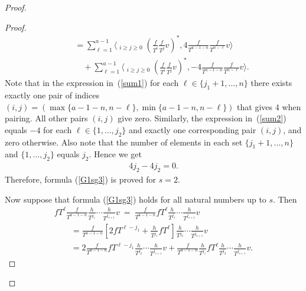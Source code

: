 \documentclass[11pt]{article}
\numberwithin{equation}{section}
\begin{document}
\begin{proof}
\begin{proof}
\begin{gather}
\qquad{} = \sum_{\ell=1}^{a-1} \bigg\langle \mathop{\sum_{i+j=a-1-\ell}}_{i\geq j\geq 0}
\left(\frac{f}{T^i}\frac{f}{T^j}v\right)^*, 4 \frac{f}{T^{a-1-n}} \frac{f}{T^{n-\ell}} v \bigg\rangle \label{sum1} \\
\qquad\quad{} + \sum_{\ell=1}^{a-1} \bigg\langle \mathop{\sum_{i+j=a-1-\ell}}_{i\geq j\geq 0} \left(\frac{f}{T^i}\frac{f}{T^j}v\right)^*, -4 \frac{f}{T^{a-1-n}} \frac{f}{T^{n-\ell}} v \bigg\rangle. \label{sum2}
\end{gather}
Note that in the expression in~(\ref{sum1}) for each $\ell \in \{j_1 +1, \dots, n \}$ there exists exactly one pair of indices $(i,j) = (\max \{a-1-n, n-\ell \} , \min \{a-1-n, n-\ell\})$ that gives $4$ when pairing. All other pairs $(i,j)$ give zero. Similarly, the expression in~(\ref{sum2}) equals $-4$ for each $\ell \in \{1, \dots, j_2 \}$ and exactly one corresponding pair $(i,j)$, and zero otherwise. Also note that the number of elements in each set $\{j_1 +1, \dots, n \}$ and $\{1, \dots, j_2 \}$ equals $j_2$. Hence we get
\begin{gather*}
4 j_2 - 4 j_2 = 0.
\end{gather*}
Therefore, formula (\ref{G1sg3}) is proved for $s=2$.

Now suppose that formula (\ref{G1sg3}) holds for all natural numbers up to $s$. Then
\begin{gather}
fT^{\ell} \frac{f}{T^{a-1-n}} \frac{h}{T^{j_1}} \cdots \frac{h}{T^{j_{s+1}}} v\ =\
 \frac{f}{T^{a-1-n}} fT^{\ell} \frac{h}{T^{j_1}} \cdots \frac{h}{T^{j_{s+1}}} v \nonumber \\
\qquad{} = \frac{f}{T^{a-1-n}} \left[ 2 fT^{\ell-j_1} + \frac{h}{T^{j_1}} fT^{\ell} \right] \frac{h}{T^{j_2}} \cdots \frac{h}{T^{j_{s+1}}} v \nonumber \\
\qquad{} = 2 \frac{f}{T^{a-1-n}} fT^{\ell-j_1} \frac{h}{T^{j_2}} \cdots \frac{h}{T^{j_{s+1}}} v + \frac{f}{T^{a-1-n}} \frac{h}{T^{j_1}} fT^{\ell} \frac{h}{T^{j_2}} \cdots \frac{h}{T^{j_{s+1}}} v. \label{fs sum2}
\end{gather}


\end{proof}
\end{proof}
\end{document}
